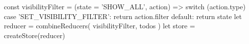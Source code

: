 const visibilityFilter = (state = 'SHOW\_ALL', action) => {
  switch (action.type) {
    case 'SET_VISIBILITY_FILTER':
      return action.filter
    default:
      return state
  }
}
let reducer = combineReducers({ visibilityFilter, todos })
let store = createStore(reducer)